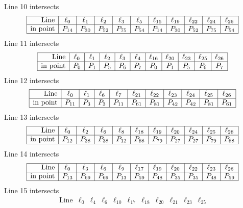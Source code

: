 \documentclass{article}
\begin{document}
{$$$$
Line 10 intersects 
$$
\begin{array}{|r*{10}{|c}|}
\hline
\mbox{Line}  & \ell_{0} & \ell_{1} & \ell_{2} & \ell_{3} & \ell_{5} & \ell_{15} & \ell_{19} & \ell_{22} & \ell_{24} & \ell_{26}\\
\hline
\mbox{in point}  & P_{14} & P_{30} & P_{52} & P_{75} & P_{54} & P_{14} & P_{30} & P_{52} & P_{75} & P_{54}\\
\hline
\end{array}
$$
Line 11 intersects 
$$
\begin{array}{|r*{10}{|c}|}
\hline
\mbox{Line}  & \ell_{0} & \ell_{1} & \ell_{2} & \ell_{3} & \ell_{4} & \ell_{16} & \ell_{20} & \ell_{23} & \ell_{25} & \ell_{26}\\
\hline
\mbox{in point}  & P_{0} & P_{1} & P_{5} & P_{6} & P_{7} & P_{0} & P_{1} & P_{5} & P_{6} & P_{7}\\
\hline
\end{array}
$$
Line 12 intersects 
$$
\begin{array}{|r*{10}{|c}|}
\hline
\mbox{Line}  & \ell_{0} & \ell_{1} & \ell_{6} & \ell_{7} & \ell_{21} & \ell_{22} & \ell_{23} & \ell_{24} & \ell_{25} & \ell_{26}\\
\hline
\mbox{in point}  & P_{11} & P_{3} & P_{3} & P_{11} & P_{61} & P_{81} & P_{42} & P_{42} & P_{81} & P_{61}\\
\hline
\end{array}
$$
Line 13 intersects 
$$
\begin{array}{|r*{10}{|c}|}
\hline
\mbox{Line}  & \ell_{0} & \ell_{2} & \ell_{6} & \ell_{8} & \ell_{18} & \ell_{19} & \ell_{20} & \ell_{24} & \ell_{25} & \ell_{26}\\
\hline
\mbox{in point}  & P_{12} & P_{38} & P_{38} & P_{12} & P_{68} & P_{79} & P_{27} & P_{27} & P_{79} & P_{68}\\
\hline
\end{array}
$$
Line 14 intersects 
$$
\begin{array}{|r*{10}{|c}|}
\hline
\mbox{Line}  & \ell_{0} & \ell_{3} & \ell_{6} & \ell_{9} & \ell_{17} & \ell_{19} & \ell_{20} & \ell_{22} & \ell_{23} & \ell_{26}\\
\hline
\mbox{in point}  & P_{13} & P_{69} & P_{69} & P_{13} & P_{59} & P_{48} & P_{35} & P_{35} & P_{48} & P_{59}\\
\hline
\end{array}
$$
Line 15 intersects 
$$
\begin{array}{|r*{10}{|c}|}
\hline
\mbox{Line}  & \ell_{0} & \ell_{4} & \ell_{6} & \ell_{10} & \ell_{17} & \ell_{18} & \ell_{20} & \ell_{21} & \ell_{23} & \ell_{25}\\

\end{array}$$}
\end{document}
